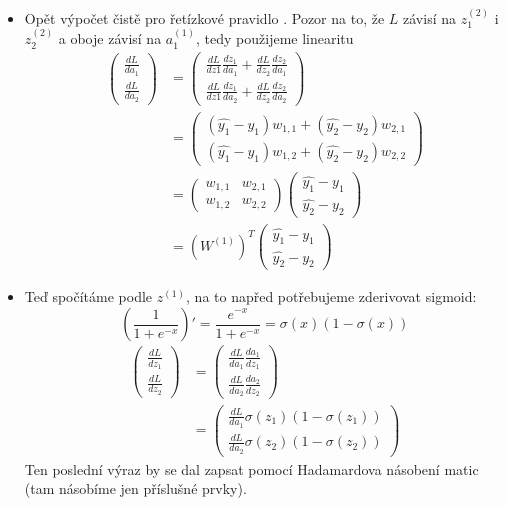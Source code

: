 \begin{itemize}
  \item  Opět výpočet čistě pro řetízkové pravidlo .
    Pozor na to, že $L$ závisí na $z^{(2)}_1$ i $z^{(2)}_2$ a oboje závisí na $a^{(1)}_1$, tedy použijeme linearitu
    \begin{align*}
      \begin{pmatrix}
        \frac{dL}{da_1} \\
        \frac{dL}{da_2}
      \end{pmatrix}
      &=
      \begin{pmatrix}
        \frac{dL}{dz1}\frac{dz_1}{da_1} + \frac{dL}{dz_2}\frac{dz_2}{da_1} \\
        \frac{dL}{dz1}\frac{dz_1}{da_2} + \frac{dL}{dz_2}\frac{dz_2}{da_2}
      \end{pmatrix} \\
      &=
      \begin{pmatrix}
        (\hat{y_1} - y_1)w_{1,1} + (\hat{y_2} - y_2)w_{2,1} \\
        (\hat{y_1} - y_1)w_{1,2} + (\hat{y_2} - y_2)w_{2,2}
      \end{pmatrix} \\
      &=
      \begin{pmatrix}
        w_{1,1} & w_{2,1} \\
        w_{1,2} & w_{2,2}
      \end{pmatrix}
      \begin{pmatrix}
        \hat{y_1} - y_1 \\
        \hat{y_2} - y_2 
      \end{pmatrix} \\
      &=
      (W^{(1)})^T
      \begin{pmatrix}
        \hat{y_1} - y_1 \\
        \hat{y_2} - y_2 
      \end{pmatrix}
    \end{align*}

  \item  Teď spočítáme podle $z^{(1)}$, na to napřed potřebujeme zderivovat sigmoid:
    $$\left( \frac{1}{1+e^{-x}} \right)' = \frac{e^{-x}}{1 + e^{-x}} = \sigma(x)(1-\sigma(x))$$
    \begin{align*}
      \begin{pmatrix}
        \frac{dL}{dz_1} \\
        \frac{dL}{dz_2}
      \end{pmatrix}
      &=
      \begin{pmatrix}
        \frac{dL}{da_1}\frac{da_1}{dz_1} \\
        \frac{dL}{da_2}\frac{da_2}{dz_2}
      \end{pmatrix} \\
      &=
      \begin{pmatrix}
        \frac{dL}{da_1} \sigma(z_1)(1-\sigma(z_1)) \\
        \frac{dL}{da_2} \sigma(z_2)(1-\sigma(z_2))
      \end{pmatrix}
    \end{align*}
    Ten poslední výraz by se dal zapsat pomocí Hadamardova násobení matic (tam násobíme jen příslušné prvky).


\end{itemize}
